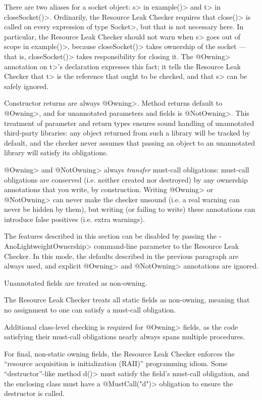 There are two aliases for a socket object: \<s> in \<example()> and \<t> in
\<closeSocket()>.  Ordinarily, the Resource Leak Checker requires that
\<close()> is called on every expression of type \<Socket>, but that is not
necessary here.  In particular, the Resource Leak Checker should not warn when
\<s> goes out of scope in \<example()>, because \<closeSocket()> takes ownership
of the socket --- that is, \<closeSocket()> takes responsibility for closing
it. The \<@Owning> annotation on \<t>'s declaration expresses this fact; it
tells the Resource Leak Checker that \<t> is the reference that ought to be
checked, and that \<s> can be safely ignored.

Constructor returns are always \<@Owning>.
Method returns default to \<@Owning>,
and for unannotated parameters and fields is \<@NotOwning>. This treatment of parameter and
return types ensures sound handling of unannotated third-party libraries: any
object returned from such a library will be tracked by default, and the checker
never assumes that passing an object to an unannotated library will satisfy its obligations.

\<@Owning> and \<@NotOwning> always \emph{transfer} must-call obligations: must-call
obligations are conserved (i.e. neither created nor destroyed) by any ownership annotations
that you write, by construction. Writing \<@Owning> or \<@NotOwning> can never make the checker
unsound (i.e. a real warning can never be hidden by them),
but writing (or failing to write) these annotations can introduce false positives (i.e. extra warnings).

The features described in this section can be disabled by passing the \<-AnoLightweightOwnership>
command-line parameter to the Resource Leak Checker.
In this mode, the defaults described in the previous paragraph are always used, and explicit \<@Owning>
and \<@NotOwning> annotations are ignored.



Unannotated fields are treated as non-owning.

The Resource Leak Checker treats all static fields as non-owning, meaning that no assignment to one
can satisfy a must-call obligation.

Additional class-level checking is required for \<@Owning>
fields, as the code
satisfying their must-call obligations nearly always spans multiple
procedures.

For final, non-static owning fields,
the Resource Leak Checker enforces the ``resource acquisition is
initialization (RAII)'' programming idiom.  Some
``destructor''-like method \<d()> must satisfy the field's must-call obligation,
and the enclosing class must have a \<@MustCall("d")> obligation to
ensure the destructor is called.

